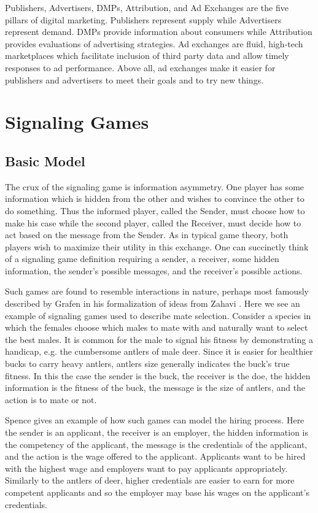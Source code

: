 \documentclass{article}
\begin{document}
Publishers, Advertisers, DMPs, Attribution, and Ad Exchanges are the five pillars of digital marketing. Publishers represent supply while Advertisers represent demand. DMPs provide information about consumers while Attribution provides evaluations of advertising strategies. Ad exchanges are fluid, high-tech marketplaces which facilitate inclusion of third party data and allow timely responses to ad performance. Above all, ad exchanges make it easier for publishers and advertisers to meet their goals and to try new things. 

\newpage

\section{Signaling Games}

\subsection{Basic Model}

The crux of the signaling game is information asymmetry. One player has some information which is hidden from the other and wishes to convince the other to do something. Thus the informed player, called the Sender, must choose how to make his case while the second player, called the Receiver, must decide how to act based on the message from the Sender. As in typical game theory, both players wish to maximize their utility in this exchange. One can succinctly think of a signaling game definition requiring a sender, a receiver, some hidden information, the sender's possible messages, and the receiver's possible actions.

Such games are found to resemble interactions in nature, perhaps most famously described by Grafen \cite{grafen1} in his formalization of ideas from Zahavi \cite{zahavi1}. Here we see an example of signaling games used to describe mate selection. Consider a species in which the females choose which males to mate with and naturally want to select the best males. It is common for the male to signal his fitness by demonstrating a handicap, e.g. the cumbersome antlers of male deer. Since it is easier for healthier bucks to carry heavy antlers, antlers size generally indicates the buck's true fitness. In this the case the sender is the buck, the receiver is the doe, the hidden information is the fitness of the buck, the message is the size of antlers, and the action is to mate or not. 

Spence \cite{spence1} gives an example of how such games can model the hiring process. Here the sender is an applicant, the receiver is an employer, the hidden information is the competency of the applicant, the message is the credentials of the applicant, and the action is the wage offered to the applicant. Applicants want to be hired with the highest wage and employers want to pay applicants appropriately. Similarly to the antlers of deer, higher credentials are easier to earn for more competent applicants and so the employer may base his wages on the applicant's credentials.
\end{document}
